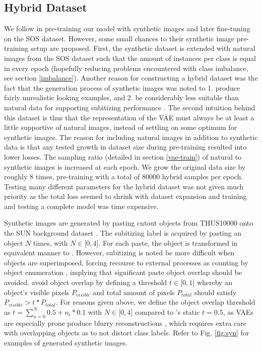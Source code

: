 \documentclass[twocolumn]{article}
\begin{document}
\hypertarget{hybrid}{%
\subsection{Hybrid Dataset}\label{hybrid}}

We follow \citet{zhang2016salient} in pre-training our model with
synthetic images and later fine-tuning on the SOS dataset. However, some
small chances to their synthetic image pre-training setup are proposed.
First, the synthetic dataset is extended with natural images from the
SOS dataset such that the amount of instances per class is equal in every epoch (hopefully reducing problems encountered with class
imbalance, see section \ref{imbalance}). Another
reason for constructing a hybrid dataset was the fact that the
generation process of synthetic images was noted to 1. produce fairly
unrealistic looking examples, and 2. be considerably less suitable than
natural data for supporting subitizing performance
\citep{zhang2016salient}. The second intuition behind this dataset is
thus that the representation of the VAE must always be at least a little
supportive of natural images, instead of settling on some optimum for
synthetic images. The reason for including natural images in addition to synthetic data is that
any tested growth in dataset size during pre-training resulted into
lower losses. 
The sampling ratio (detailed in section \ref{vae-train}) of natural to synthetic images is increased at each epoch. We grow the
original data size by roughly 8 times, pre-training with a total of
80000 hybrid samples per epoch. Testing many different parameters for
the hybrid dataset was not given much priority as the total loss seemed
to shrink with dataset expansion and training and testing a complete model
was time expensive.

Synthetic images are generated by pasting cutout objects from THUS10000
\citep{cheng2015global} onto the SUN background dataset
\citep{xiao2010sun}. The subitizing label is acquired by pasting an
object \(N\) times, with \(N \in \lbrack0, 4\rbrack\). For each paste,
the object is transformed in equivalent manner to
\citet{zhang2016salient}. However, subitizing is noted be more difficult
when objects are superimposed, forcing recourse to external processes as
counting by object enumeration \citep[p.~57.]{dehaene2011number},
implying that significant paste object overlap should be avoided.
\citet{zhang2016salient} avoid object overlap by defining a threshold
\(t \in \lbrack0,1\rbrack\) whereby an object's visible pixels
\(P_{visible}\) and total amount of pixels \(P_{total}\) should satisfy
\(P_{visible} > t * P_{total}\). For reasons given above, we define the
object overlap threshold as \(t = \sum_{n=0}^{N} 0.5 + n_i * 0.1\) with
\(N \in \lbrack0,4\rbrack\) compared to \citet{zhang2016salient}'s
static \(t=0.5\), as VAEs are especially prone produce blurry
reconstructions \citep{hou2017deep, larsen2015autoencoding}, which
requires extra care with overlapping objects as to not distort class
labels. Refer to Fig. \ref{fig:syn} for examples of generated synthetic images.
\end{document}
